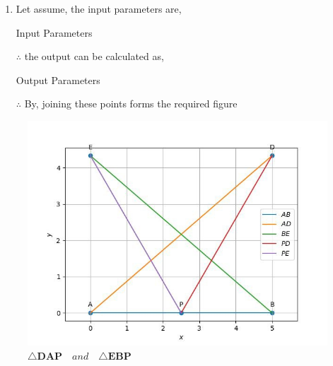 \documentclass[11pt, a4paper]{article}
\let\vec\mathbf
\begin{document}
\begin{enumerate}
\begin{enumerate}[label=(\roman*)]
\item Let assume, the input parameters are, 
\begin{table}[H]
\centering
	
	  \caption{Input Parameters}
	  \label{Table-1: }
\end{table}

$\therefore$ the output can be calculated as,
\begin{table}[H]
\centering
	
	  \caption{Output Parameters}
	  \label{Table-2: }
\end{table}

$\therefore$ By, joining these points forms the required figure

\end{enumerate}
\end{enumerate}

\begin{figure}[H]
    \includegraphics[width=\columnwidth]{figs/fig_math_comp}
	\caption{$\triangle \vec{DAP} \hspace{12pt} and \hspace{12pt} \triangle \vec{EBP}$}
    \label{fig:fig2}
\end{figure}
\end{document}
